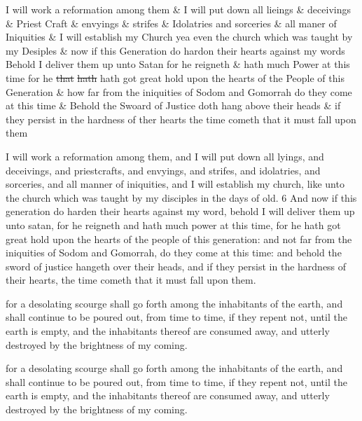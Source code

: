 		\begin{framed}
		\scriptsize
			\begin{compactdesc}
				\item[JSP] I will work a reformation among them \& I will put down all lieings \& deceivings \& Priest Craft \& envyings \& strifes \& Idolatries and sorceries \& all maner of Iniquities \& I will establish my Church yea even the church which was taught by my Desiples \& now if this Generation do hardon their hearts against my words Behold I deliver them up unto Satan for he reigneth \& hath much Power at this time for he \sout{that} \sout{hath} hath got great hold upon the hearts of the People of this Generation \& how far from the iniquities of Sodom and Gomorrah do they come at this time \& Behold the Swoard of Justice doth hang above their heads \& if they persist in the hardness of ther hearts the time cometh that it must fall upon them
				\item[RB1] [\textit{missing}]
				\item[BC] I will work a reformation among them, and I will put down all lyings, and deceivings, and priestcrafts, and envyings, and strifes, and idolatries, and sorceries, and all manner of iniquities, and I will establish my church, like unto the church which was taught by my disciples in the days of old. 6 And now if this generation do harden their hearts against my word, behold I will deliver them up unto satan, for he reigneth and hath much power at this time, for he hath got great hold upon the hearts of the people of this generation: and not far from the iniquities of Sodom and Gomorrah, do they come at this time: and behold the sword of justice hangeth over their heads, and if they persist in the hardness of their hearts, the time cometh that it must fall upon them.
				\item[DC 1835] for a desolating scourge shall go forth among the inhabitants of the earth, and shall continue to be poured out, from time to time, if they repent not, until the earth is empty, and the inhabitants thereof are consumed away, and utterly destroyed by the brightness of my coming.
				\item[DC 1844] for a desolating scourge shall go forth among the inhabitants of the earth, and shall continue to be poured out, from time to time, if they repent not, until the earth is empty, and the inhabitants thereof are consumed away, and utterly destroyed by the brightness of my coming.
			\end{compactdesc}
		\end{framed}

